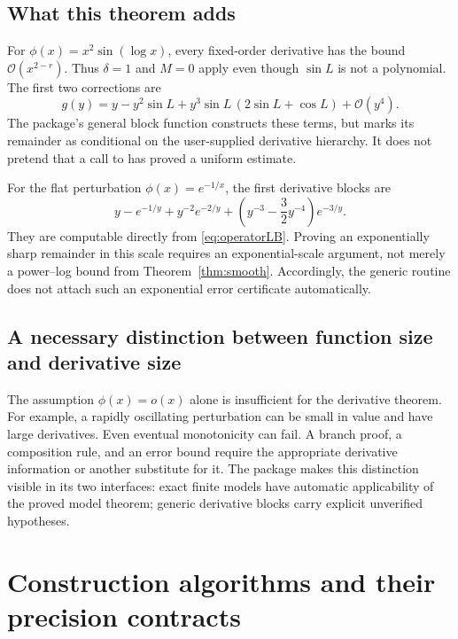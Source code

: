 \documentclass[11pt,a4paper]{article}
\numberwithin{equation}{section}
\theoremstyle{definition}\newtheorem{definition}[theorem]{Definition}
\theoremstyle{remark}\newtheorem{remark}[theorem]{Remark}
\newcommand{\OO}{\mathcal O}\newcommand{\Id}{\mathrm{id}}
\newcommand{\code}[1]{\texttt{\detokenize{#1}}}
\begin{document}
\subsection{What this theorem adds}
For $\phi(x)=x^2\sin(\log x)$, every fixed-order derivative has the bound $\OO(x^{2-r})$. Thus $\delta=1$ and $M=0$ apply even though $\sin L$ is not a polynomial. The first two corrections are
\begin{equation}
g(y)=y-y^2\sin L+y^3\sin L\,(2\sin L+\cos L)+\OO(y^4).
\end{equation}
The package's general block function constructs these terms, but marks its remainder as conditional on the user-supplied derivative hierarchy. It does not pretend that a call to \code{D} has proved a uniform estimate.

For the flat perturbation $\phi(x)=e^{-1/x}$, the first derivative blocks are
\begin{equation}\label{eq:flatblocks}
y-e^{-1/y}+y^{-2}e^{-2/y}
+\left(y^{-3}-\frac32y^{-4}\right)e^{-3/y}.
\end{equation}
They are computable directly from \eqref{eq:operatorLB}. Proving an exponentially sharp remainder in this scale requires an exponential-scale argument, not merely a power--log bound from Theorem~\ref{thm:smooth}. Accordingly, the generic routine does not attach such an exponential error certificate automatically.

\subsection{A necessary distinction between function size and derivative size}
The assumption $\phi(x)=o(x)$ alone is insufficient for the derivative theorem. For example, a rapidly oscillating perturbation can be small in value and have large derivatives. Even eventual monotonicity can fail. A branch proof, a composition rule, and an error bound require the appropriate derivative information or another substitute for it. The package makes this distinction visible in its two interfaces: exact finite models have automatic applicability of the proved model theorem; generic derivative blocks carry explicit unverified hypotheses.

\section{Construction algorithms and their precision contracts}
\label{sec:algorithms}
\end{document}
